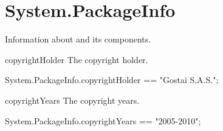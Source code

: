 
\section{System.PackageInfo}
Information about \usdk and its components.

\begin{urbiscriptapi}
\item[copyrightHolder] The \usdk copyright holder.
\begin{urbiassert}
System.PackageInfo.copyrightHolder == "Gostai S.A.S.";
\end{urbiassert}

\item[copyrightYears] The \usdk copyright years.
\begin{urbiassert}
System.PackageInfo.copyrightYears == "2005-2010";
\end{urbiassert}
\end{urbiscriptapi}

